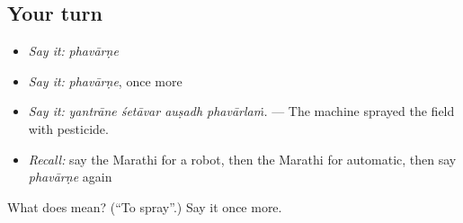 \subsection*{Your turn}
\begin{itemize}
\raggedright
  \item \emph{Say it:} \emph{phavārṇe}
  \item \emph{Say it:} \emph{phavārṇe}, once more
  \item \emph{Say it:} \emph{yantrāne śetāvar auṣadh phavārlaṁ.} — The machine sprayed the field with pesticide.
  \item \emph{Recall:} say the Marathi for a robot, then the Marathi for automatic, then say \emph{phavārṇe} again
\end{itemize}

\begin{tcolorbox}[breakable,colback=teal!4,colframe=teal!35!black,title={Before you move on}]
What does  mean? (\textquotedblleft{}To spray\textquotedblright{}.) Say it once more.
\end{tcolorbox}
